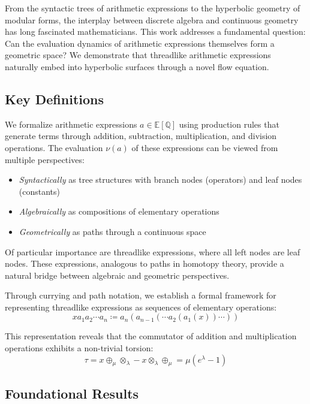 From the syntactic trees of arithmetic expressions to the hyperbolic geometry of modular forms, the interplay between discrete algebra and continuous geometry has long fascinated mathematicians. This work addresses a fundamental question: Can the evaluation dynamics of arithmetic expressions themselves form a geometric space? We demonstrate that threadlike arithmetic expressions naturally embed into hyperbolic surfaces through a novel flow equation.

\subsection{Key Definitions}

We formalize arithmetic expressions $a \in \mathbb{E}[\mathbb{Q}]$ using production rules that generate terms through addition, subtraction, multiplication, and division operations. The evaluation $\nu(a)$ of these expressions can be viewed from multiple perspectives:

\begin{itemize}
    \item \textit{Syntactically} as tree structures with branch nodes (operators) and leaf nodes (constants)
    \item \textit{Algebraically} as compositions of elementary operations
    \item \textit{Geometrically} as paths through a continuous space
\end{itemize}

Of particular importance are threadlike expressions, where all left nodes are leaf nodes. These expressions, analogous to paths in homotopy theory, provide a natural bridge between algebraic and geometric perspectives.

Through currying and path notation, we establish a formal framework for representing threadlike expressions as sequences of elementary operations:
\begin{equation}
x a_1 a_2 \cdots a_n \coloneqq a_n(a_{n-1}(\cdots a_2(a_1(x))\cdots))
\end{equation}

This representation reveals that the commutator of addition and multiplication operations exhibits a non-trivial torsion:
\begin{equation}
\tau = x \oplus_\mu \otimes_\lambda - x \otimes_\lambda \oplus_\mu = \mu(e^\lambda - 1)
\end{equation}

\subsection{Foundational Results}

